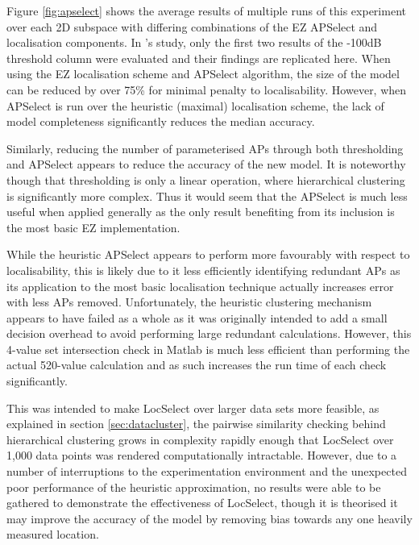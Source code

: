 \documentclass{UoYCSproject}
\begin{document}
                Figure \ref{fig:apselect} shows the average results of multiple runs of this experiment over each 2D subspace with differing combinations of the EZ APSelect and localisation components. In \citeauthor{chintalapudi2010indoor}'s study, only the first two results of the -100dB threshold column were evaluated and their findings are replicated here. When using the EZ localisation scheme and APSelect algorithm, the size of the model can be reduced by over 75\% for minimal penalty to localisability. However, when APSelect is run over the heuristic (maximal) localisation scheme, the lack of model completeness significantly reduces the median accuracy. 
                
                Similarly, reducing the number of parameterised APs through both thresholding and APSelect appears to reduce the accuracy of the new model. It is noteworthy though that thresholding is only a linear operation, where hierarchical clustering is significantly more complex. Thus it would seem that the APSelect is much less useful when applied generally as the only result benefiting from its inclusion is the most basic EZ implementation. 
                
                While the heuristic APSelect appears to perform more favourably with respect to localisability, this is likely due to it less efficiently identifying redundant APs as its application to the most basic localisation technique actually increases error with less APs removed. Unfortunately, the heuristic clustering mechanism appears to have failed as a whole as it was originally intended to add a small decision overhead to avoid performing large redundant calculations. However, this 4-value set intersection check in Matlab is much less efficient than performing the actual 520-value calculation and as such increases the run time of each check significantly.
                
                This was intended to make LocSelect over larger data sets more feasible, as explained in section \ref{sec:datacluster}, the pairwise similarity checking behind hierarchical clustering grows in complexity rapidly enough that LocSelect over 1,000 data points was rendered computationally intractable. However, due to a number of interruptions to the experimentation environment and the unexpected poor performance of the heuristic approximation, no results were able to be gathered to demonstrate the effectiveness of LocSelect, though it is theorised it may improve the accuracy of the model by removing bias towards any one heavily measured location.
        
\end{document}

